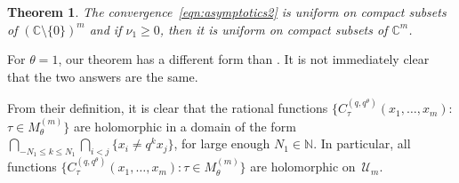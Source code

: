 \documentclass[pdftex]{sigma}
\numberwithin{equation}{section}
\newtheorem{thm}{Theorem}[section]
\newcommand{\C}{\mathbb{C}}
\newcommand{\N}{\mathbb{N}}
\newcommand{\U}{\mathcal{U}}
\begin{document}
\begin{thm}
The convergence~\eqref{eqn:asymptotics2} is uniform on compact subsets of $(\C \setminus \{0\})^m$ and if $\nu_1\geq 0$, then it is uniform on compact subsets of $\C^m$.
\end{thm}

\begin{rem}
For $\theta = 1$, our theorem has a dif\/ferent form than \cite[Theorem~6.5]{GP}. It is not immediately clear that the two answers are the same.
\end{rem}

\begin{rem}
From their def\/inition, it is clear that the rational functions $\big\{C_{\tau}^{(q, q^{\theta})}(x_1, \dots, x_m)\colon$ $\tau\in M_{\theta}^{(m)}\big\}$ are holomorphic in a domain of the form $\bigcap\limits_{-N_1 \leq k \leq N_1}{\bigcap\limits_{i<j}\{x_i \neq q^kx_j\}}$, for large enough $N_1\in\N$. In particular, all functions $\big\{C_{\tau}^{(q, q^{\theta})}(x_1, \dots, x_m)\colon \tau\in M_{\theta}^{(m)}\big\}$ are holomorphic on~$\U_m$.
\end{rem}
\end{document}
